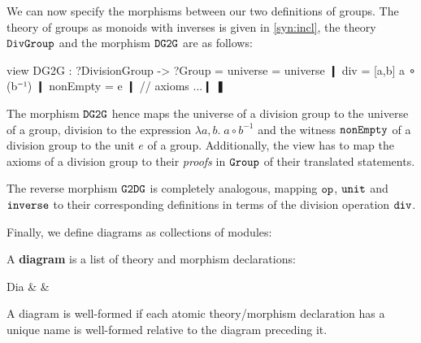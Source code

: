 \begin{example}\label{ex:dg2g}
	We can now specify the morphisms between our two definitions of groups. The theory of groups as monoids with inverses is given in \autoref{syn:incl}, the theory $\operatorname{\mathtt{DivGroup}}$ and the morphism $\operatorname{\mathtt{DG2G}}$ are as follows:
\begin{mmtcode}
view DG2G : ?DivisionGroup -> ?Group =
  universe = universe ❙
  div = [a,b] a ∘ (b⁻¹) ❙
  nonEmpty = e ❙
  // axioms ...❙
❚
\end{mmtcode}
The morphism $\operatorname{\mathtt{DG2G}}$ hence maps the universe of a division group to the universe of a group, division to the expression $\lambda a,b.\; a\circ b^{-1}$ and the witness $\operatorname{\mathtt{nonEmpty}}$ of a division group to the unit $e$ of a group. Additionally, the view has to map the axioms of a division group to their \emph{proofs} in $\operatorname{\mathtt{Group}}$ of their translated statements.

The reverse morphism $\operatorname{\mathtt{G2DG}}$ is completely analogous, mapping $\operatorname{\mathtt{op}}$, $\operatorname{\mathtt{unit}}$ and $\operatorname{\mathtt{inverse}}$ to their corresponding definitions in terms of the division operation $\operatorname{\mathtt{div}}$.
\end{example}


Finally, we define diagrams as collections of modules:

\begin{definition}[Diagram]
A \textbf{diagram} is a list of theory and morphism declarations:
\begin{grammar}
Dia    &           & \\
\end{grammar}
A diagram is well-formed if each atomic theory/morphism declaration has a unique name is well-formed relative to the diagram preceding it.
\end{definition}

